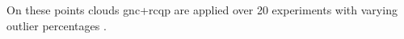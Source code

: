 On these points clouds \gls{gnc}+\gls{rcqp} are applied over \num{20} experiments with varying outlier percentages . \medskip


